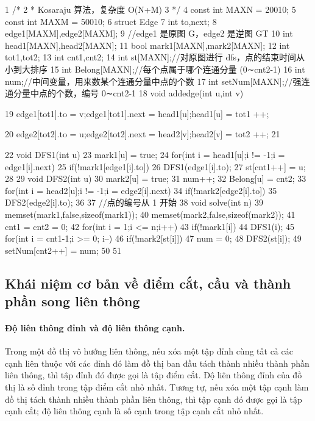 \documentclass[11pt]{article}
\begin{document}
\begin{Code}
 1   /*
 2    * Kosaraju 算法，复杂度 O(N+M)
 3    */
 4   const int MAXN = 20010;
 5   const int MAXM = 50010;
 6   struct Edge{
 7       int to,next;
 8   }edge1[MAXM],edge2[MAXM];
 9   //edge1 是原图 G，edge2 是逆图 GT
10   int head1[MAXN],head2[MAXN];
11   bool mark1[MAXN],mark2[MAXN];
12   int tot1,tot2;
13   int cnt1,cnt2;
14   int st[MAXN];//对原图进行 dfs，点的结束时间从小到大排序
15   int Belong[MAXN];//每个点属于哪个连通分量 (0∼cnt2-1)
16   int num;//中间变量，用来数某个连通分量中点的个数
17   int setNum[MAXN];//强连通分量中点的个数，编号 0∼cnt2-1
18   void addedge(int u,int v){
19       edge1[tot1].to = v;edge1[tot1].next = head1[u];head1[u] = tot1
            ++;


20         edge2[tot2].to = u;edge2[tot2].next = head2[v];head2[v] = tot2
              ++;
21   }
22   void DFS1(int u){
23       mark1[u] = true;
24       for(int i = head1[u];i != -1;i = edge1[i].next)
25           if(!mark1[edge1[i].to])
26               DFS1(edge1[i].to);
27       st[cnt1++] = u;
28   }
29   void DFS2(int u){
30       mark2[u] = true;
31       num++;
32       Belong[u] = cnt2;
33       for(int i = head2[u];i != -1;i = edge2[i].next)
34           if(!mark2[edge2[i].to])
35               DFS2(edge2[i].to);
36   }
37   //点的编号从 1 开始
38   void solve(int n){
39       memset(mark1,false,sizeof(mark1));
40       memset(mark2,false,sizeof(mark2));
41       cnt1 = cnt2 = 0;
42       for(int i = 1;i <= n;i++)
43           if(!mark1[i])
44               DFS1(i);
45       for(int i = cnt1-1;i >= 0; i--)
46           if(!mark2[st[i]]){
47               num = 0;
48               DFS2(st[i]);
49               setNum[cnt2++] = num;
50           }
51   }
\end{Code}

\subsection{Khái niệm cơ bản về điểm cắt, cầu và thành phần song liên thông}

\paragraph{Độ liên thông đỉnh và độ liên thông cạnh.} Trong một đồ thị vô hướng liên thông, nếu xóa một tập đỉnh cùng tất cả các cạnh liên thuộc với các đỉnh đó làm đồ thị ban đầu tách thành nhiều thành phần liên thông, thì tập đỉnh đó được gọi là tập điểm cắt. Độ liên thông đỉnh của đồ thị là số đỉnh trong tập điểm cắt nhỏ nhất. Tương tự, nếu xóa một tập cạnh làm đồ thị tách thành nhiều thành phần liên thông, thì tập cạnh đó được gọi là tập cạnh cắt; độ liên thông cạnh là số cạnh trong tập cạnh cắt nhỏ nhất.
\end{document}
